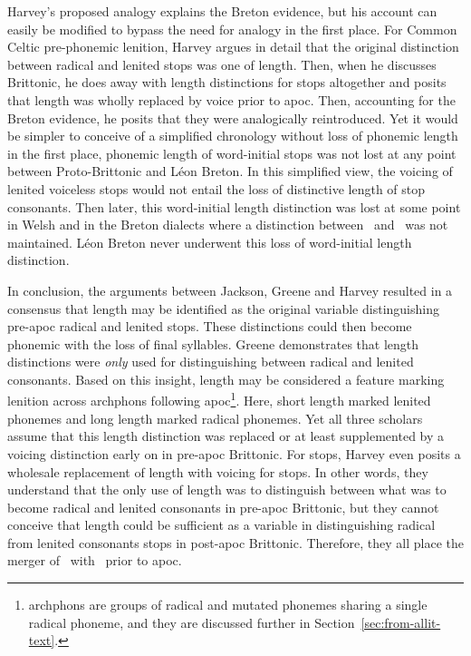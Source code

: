 Harvey's proposed analogy explains the Breton evidence, but his account can easily be modified to bypass the need for  analogy in the first place. For Common Celtic pre-phonemic lenition, Harvey argues in detail that the original distinction between radical and lenited stops was one of length. Then, when he discusses Brittonic, he does away with length distinctions for stops altogether and posits that length was wholly replaced by voice prior to \gls{apoc}. Then, accounting for the Breton evidence, he posits that they were analogically reintroduced. Yet it would be simpler to conceive of a simplified chronology without  loss of phonemic length in the first place, \ie phonemic length of word-initial stops was not lost at any point between Proto-Brittonic and Léon Breton. In this simplified view, the voicing of lenited voiceless stops would not entail the loss of distinctive length of stop consonants. Then later, this word-initial length distinction was lost at some point in Welsh and in the Breton dialects where a distinction between \lT\ and \xD\ was not maintained. Léon Breton never underwent this loss of word-initial length distinction.

In conclusion, the arguments between Jackson, Greene and Harvey resulted in a consensus that length may be identified as the original variable distinguishing pre-\gls{apoc} radical and lenited stops. These distinctions could then become phonemic with the loss of final syllables. Greene demonstrates that length distinctions were \emph{only} used for distinguishing between radical and lenited consonants. Based on this insight, length may be considered a feature marking lenition across \gls{archphon}s following \gls{apoc}\footnote{\Gls{archphon}s are groups of radical and mutated phonemes sharing a single radical phoneme, and they are discussed further  in Section~\ref{sec:from-allit-text}.}. Here, short length marked lenited \gls{phoneme}s and long length marked radical \gls{phoneme}s. Yet all three scholars assume that this length distinction was replaced or at least supplemented by a voicing distinction early on in pre-\gls{apoc} Brittonic. For stops, Harvey even posits a wholesale replacement of length with voicing for stops. In other words, they understand that the only use of length was to distinguish between what was to become radical and lenited consonants in pre-\gls{apoc} Brittonic, but they cannot conceive that length could be sufficient as a variable in distinguishing radical from lenited consonants stops in post-\gls{apoc} Brittonic. Therefore, they all place the merger of \lT\ with \xD\ prior to \gls{apoc}.

